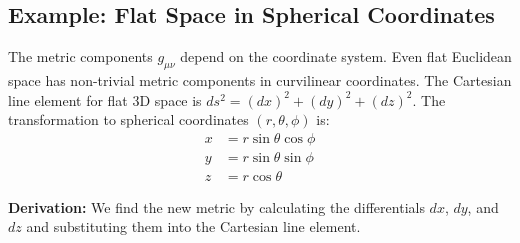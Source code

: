 \documentclass[11pt, a4paper]{report}
\begin{document}
\subsection*{Example: Flat Space in Spherical Coordinates}
The metric components $g_{\mu\nu}$ depend on the coordinate system. Even flat Euclidean space has non-trivial metric components in curvilinear coordinates.
The Cartesian line element for flat 3D space is $ds^2 = (dx)^2 + (dy)^2 + (dz)^2$.
The transformation to spherical coordinates $(r, \theta, \phi)$ is:
\begin{align*}
    x &= r \sin\theta \cos\phi \\
    y &= r \sin\theta \sin\phi \\
    z &= r \cos\theta
\end{align*}

\textbf{Derivation:}
We find the new metric by calculating the differentials $dx$, $dy$, and $dz$ and substituting them into the Cartesian line element.
\end{document}

